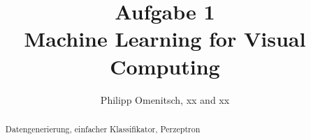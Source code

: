 \documentclass{article}
\begin{document}
\title{Aufgabe 1 \\ Machine Learning for Visual Computing}
\author{Philipp Omenitsch, xx and xx}



\maketitle
\begin{abstract}
Datengenerierung, einfacher Klassifikator, Perzeptron
\end{abstract}

\tableofcontents
\clearpage
{}







\end{document}

